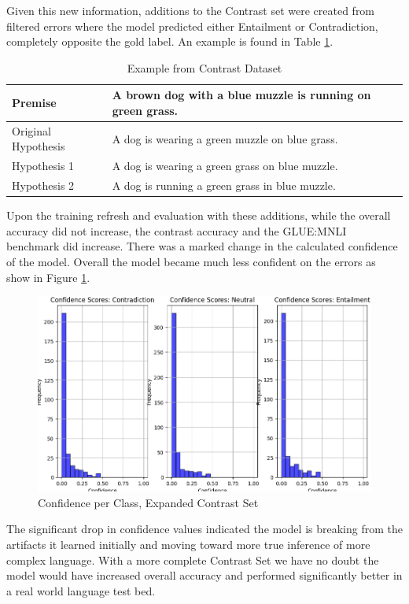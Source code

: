 \documentclass[11pt]{article}
\begin{document}
Given this new information, additions to the Contrast set were created from filtered errors where the model predicted either Entailment or Contradiction, completely opposite the gold label. An example is found in Table \ref{tab:AnnotationOfContrastSet}.
\begin{table}[!ht]
    \centering
    \begin{tabularx}{0.5\textwidth} { 
  | >{\raggedright\arraybackslash}X 
  | >{\raggedright\arraybackslash}X | }
    \hline
        Premise & A brown dog with a blue muzzle is running on green grass.\\
        \hline
        Original Hypothesis & A dog is wearing a green muzzle on blue grass.\\
        \hline
        Hypothesis 1 & A dog is wearing a green grass on blue muzzle.\\
        \hline
        Hypothesis 2 & A dog is running a green grass in blue muzzle.\\
        \hline
    \end{tabularx}
    \caption{Example from Contrast Dataset}
    \label{tab:AnnotationOfContrastSet}
\end{table}

Upon the training refresh and evaluation with these additions, while the overall accuracy did not increase, the contrast accuracy and the GLUE:MNLI benchmark did increase. There was a marked change in the calculated confidence of the model. Overall the model became much less confident on the errors as show in Figure \ref{fig:Confidence3}.
\begin{figure}[h!]
    \centering
    \includegraphics[width=0.85\linewidth]{Figure_confByClass3.png}
    \caption{Confidence per Class, Expanded Contrast Set}
    \label{fig:Confidence3}
\end{figure}
The significant drop in confidence values indicated the model is breaking from the artifacts it learned initially and moving toward more true inference of more complex language. With a more complete Contrast Set we have no doubt the model would have increased overall accuracy and performed significantly better in a real world language test bed.
\end{document}
